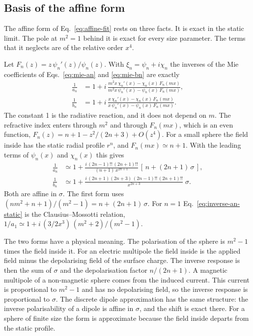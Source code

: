 \documentclass[11pt,a4paper]{article}
\begin{document}
\subsection{Basis of the affine form}
\label{sec:affine-basis}
The affine form of Eq.~\eqref{eq:affine-fit} rests on three facts.
It is exact in the static limit.
The pole at $m^2 = 1$ behind it is exact for every size parameter.
The terms that it neglects are of the relative order $x^4$.

Let $F_n(z) = z\,\psi_n'(z)/\psi_n(z)$.
With $\xi_n = \psi_n + i\chi_n$ the inverses of the Mie coefficients of Eqs.~\eqref{eq:mie-an} and \eqref{eq:mie-bn} are exactly
\begin{align}
  \frac{1}{a_n} &= 1 + i\,\frac{m^2 x\,\chi_n'(x) - \chi_n(x)\,F_n(mx)}{m^2 x\,\psi_n'(x) - \psi_n(x)\,F_n(mx)},
  \label{eq:inverse-an} \\
  \frac{1}{b_n} &= 1 + i\,\frac{x\,\chi_n'(x) - \chi_n(x)\,F_n(mx)}{x\,\psi_n'(x) - \psi_n(x)\,F_n(mx)}.
  \label{eq:inverse-bn}
\end{align}
The constant 1 is the radiative reaction, and it does not depend on $m$.
The refractive index enters through $m^2$ and through $F_n(mx)$, which is an even function, $F_n(z) = n + 1 - z^2/(2n+3) + O(z^4)$.
For a small sphere the field inside has the static radial profile $r^n$, and $F_n(mx) \simeq n + 1$.
With the leading terms of $\psi_n(x)$ and $\chi_n(x)$ this gives
\begin{align}
  \frac{1}{a_n} &\simeq 1 + \frac{i\,(2n-1)!!\,(2n+1)!!}{(n+1)\,x^{2n+1}}\,\left[\,n + (2n+1)\,\sigma\,\right],
  \label{eq:inverse-an-static} \\
  \frac{1}{b_n} &\simeq 1 + \frac{i\,(2n+1)(2n+3)\,(2n-1)!!\,(2n+1)!!}{x^{2n+3}}\;\sigma.
  \label{eq:inverse-bn-static}
\end{align}
Both are affine in $\sigma$.
The first form uses $(n m^2 + n + 1)/(m^2 - 1) = n + (2n+1)\,\sigma$.
For $n = 1$ Eq.~\eqref{eq:inverse-an-static} is the Clausius--Mossotti relation, $1/a_1 \simeq 1 + i\,(3/2x^3)\,(m^2+2)/(m^2-1)$.

The two forms have a physical meaning.
The polarisation of the sphere is $m^2 - 1$ times the field inside it.
For an electric multipole the field inside is the applied field minus the depolarising field of the surface charge.
The inverse response is then the sum of $\sigma$ and the depolarisation factor $n/(2n+1)$.
A magnetic multipole of a non-magnetic sphere comes from the induced current.
This current is proportional to $m^2 - 1$ and has no depolarising field, so the inverse response is proportional to $\sigma$.
The discrete dipole approximation has the same structure: the inverse polarisability of a dipole is affine in $\sigma$, and the shift is exact there.
For a sphere of finite size the form is approximate because the field inside departs from the static profile.
\end{document}
